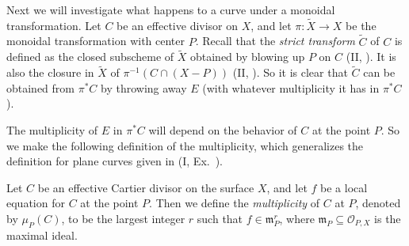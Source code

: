 {\smallskip
Next we will investigate what happens to a curve under a monoidal transformation. Let $C$ be an effective divisor on $X$, and let $\pi\colon\widetilde X\to X$ be the monoidal transformation with center $P$. Recall that the \emph{strict transform} $\widetilde C$ of $C$ is defined as the closed subscheme of $\widetilde X$ obtained by blowing up $P$ on $C$ (II, ). It is also the closure in $\widetilde X$ of $\pi^{-1}(C\cap(X-P))$ (II, ). So it is clear that $\widetilde C$ can be obtained from $\pi^*C$ by throwing away $E$ (with whatever multiplicity it has in $\pi^*C$).

The multiplicity of $E$ in $\pi^*C$ will depend on the behavior of $C$ at the point $P$. So we make the following definition of the multiplicity, which generalizes the definition for plane curves given in (I, Ex.~).

\Dfn Let $C$ be an effective Cartier divisor on the surface $X$, and let $f$ be a local equation for $C$ at the point $P$. Then we define the \emph{multiplicity} of $C$ at $P$, denoted by $\mu_P(C)$, to be the largest integer $r$ such that $f\in\mathfrak m_P^r$, where $\mathfrak m_P\subseteq\mathcal O_{P,X}$ is the maximal ideal.
}
